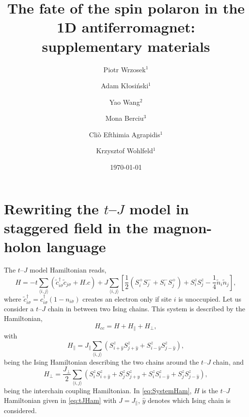 \documentclass[%
 reprint,
 amsmath,amssymb,
 aps, onecolumn,
prl,
]{revtex4-1}
\newcommand{\mean}[1]{\langle#1\rangle}
\begin{document}

\title{The fate of the spin polaron in the 1D antiferromagnet: \\ supplementary materials
}

\author{Piotr Wrzosek$^1$}
\author{Adam K\l{}osi\'nski$^1$}
\author{Yao Wang$^2$}
\author{Mona Berciu$^3$}
\author{Cli\`o Efthimia Agrapidis$^1$}
\author{Krzysztof Wohlfeld$^1$}
 
%

%

%

\date{\today}%
			 
\maketitle

\section{Rewriting the $t$--$J$ model in staggered field in the magnon-holon language}

The $t$--$J$ model Hamiltonian reads,
\begin{equation}
	H = -t\sum_{\mean{i,j}}\left(\tilde{c}_{i\sigma}^\dagger\tilde{c}_{j\sigma} + H.c\right)
	+ J\sum_{\mean{i,j}}\left[\frac{1}{2}\left(S_i^+S_j^- + S_i^-S_j^+\right) + S_i^zS_j^z - \frac{1}{4}\tilde{n}_i\tilde{n}_j\right],
	\label{eq:tJHam}
\end{equation}
where $\tilde{c}_{i\sigma}^\dagger = c_{i\sigma}^\dagger(1-n_{i\bar{\sigma}})$  creates an electron only if site $i$ is unoccupied. Let us consider a $t$--$J$ chain in between two Ising chains. This system is described by the Hamiltonian,
\begin{equation}
	H_{cc} = H + H_\parallel + H_\perp,
	\label{eq:SystemHam}
\end{equation}
%
with
%
\begin{equation}
	H_\parallel = J_\parallel \sum_{\mean{i,j}} \left( S_{i+\hat{y}}^z S_{j+\hat{y}}^z + S_{i-\hat{y}}^zS_{j-\hat{y}}^z \right),
	\label{eq:IsingHam}
\end{equation}
%
being the Ising Hamiltonian describing the two chains around the $t$--$J$ chain, and
%
\begin{equation}
	H_\perp = \frac{J_\perp}{2} \sum_{\mean{i,j}} \left( S_{i}^z S_{i+\hat{y}}^z + S_{j}^z S_{j+\hat{y}}^z + S_{i}^z S_{i-\hat{y}}^z + S_{j}^z S_{j-\hat{y}}^z \right),
	\label{eq:ICHam}
\end{equation}
%
being the interchain coupling Hamiltonian. In \eqref{eq:SystemHam}, $H$ is the $t$--$J$ Hamiltonian given in \eqref{eq:tJHam} with $J = J_\parallel$, $\hat y$ denotes which Ising chain is considered.
\end{document}

